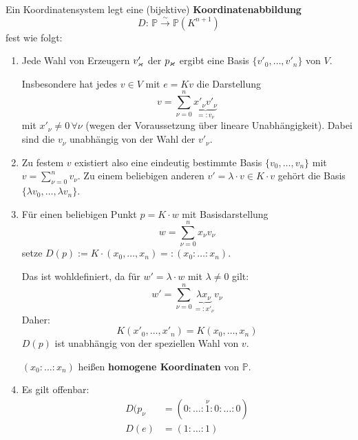 \documentclass[parskip,a4paper,twoside,DIV15,BCOR12mm]{scrbook}
\begin{document}
\begin{note}
Ein Koordinatensystem legt eine (bijektive) \textbf{Koordinatenabbildung}
\[
D:\,\mathbb{P}\overset{\sim}{\to}\mathbb{P}(K^{n+1})
\]
fest wie folgt:
\begin{enumerate}
\item Jede Wahl von Erzeugern \(v'_{\varkappa}\) der \(p_{\varkappa}\) ergibt eine Basis
\(\{v'_{0},\ldots,v'_{n}\}\) von \(V\).

Insbesondere hat jedes \(v\in V\) mit \(e=Kv\) die Darstellung
\[
v=\sum_{\nu=0}^{n}{\underbrace{x'_{\nu}v'_{\nu}}_{=:v_{\nu}}}
\]
mit \(x'_{\nu}\neq0\,\forall\nu\) (wegen der Voraussetzung über lineare
Unabhängigkeit). Dabei sind die \(v_{\nu}\) unabhängig von der Wahl der
\(v'_{\nu}\).
\item Zu festem \(v\) existiert also eine eindeutig bestimmte Basis 
\(\{v_{0},\ldots,v_{n}\}\) mit \(v=\sum_{\nu=0}^{n}{v_{\nu}}\). Zu einem
beliebigen anderen \(v'=\lambda\cdot v\in K\cdot v\) gehört die Basis
\(\{\lambda v_{0},\ldots,\lambda v_{n}\}\).
\item Für einen beliebigen Punkt \(p=K\cdot w\) mit Basisdarstellung
\[
w=\sum_{\nu=0}^{n}{x_{\nu}v_{\nu}}
\]
setze \(D(p):=K\cdot(x_{0},\ldots,x_{n})=:(x_{0}:\ldots:x_{n})\).

Das ist wohldefiniert, da für \(w'=\lambda\cdot w\) mit \(\lambda\neq0\) gilt:
\[
w'=\sum_{\nu=0}^{n}{\underbrace{\lambda x_{\nu}}_{=:x'_{\nu}}v_{\nu}}
\]
Daher:
\[
K(x'_{0},\ldots,x'_{n})=K(x_{0},\ldots,x_{n})
\]
\(D(p)\) ist unabhängig von der speziellen Wahl von \(v\).

\((x_{0}:\ldots:x_{n})\) heißen \textbf{homogene Koordinaten} von 
\(\mathbb{P}\).
\item Es gilt offenbar:
\begin{align*}
D(p_{\nu}&=(0:\ldots:\overset{\nu}{1}:0:\ldots:0)\\
D(e)&=(1:\ldots:1)
\end{align*}
\end{enumerate}
\end{note}
\end{document}
